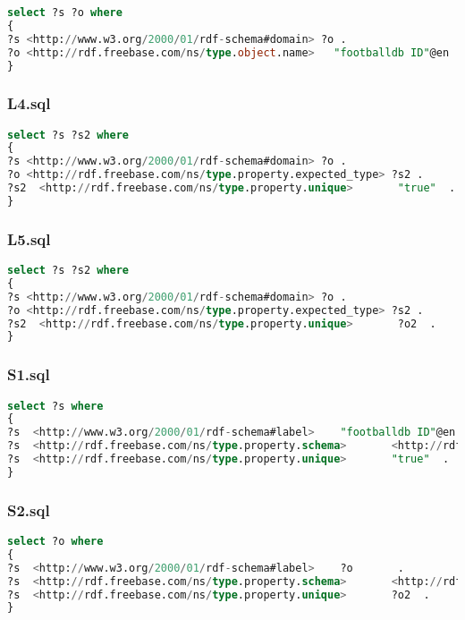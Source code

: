 \documentclass[titlepage, a4paper, 12pt] {article}
\begin{document}
\begin{lstlisting}[language=SQL]
select ?s ?o where
{
?s <http://www.w3.org/2000/01/rdf-schema#domain> ?o .
?o <http://rdf.freebase.com/ns/type.object.name>   "footballdb ID"@en       .
}
\end{lstlisting}

\subsubsection{L4.sql}

\begin{lstlisting}[language=SQL]
select ?s ?s2 where
{
?s <http://www.w3.org/2000/01/rdf-schema#domain> ?o .
?o <http://rdf.freebase.com/ns/type.property.expected_type> ?s2 .
?s2  <http://rdf.freebase.com/ns/type.property.unique>       "true"  .
}
\end{lstlisting}

\subsubsection{L5.sql}

\begin{lstlisting}[language=SQL]
select ?s ?s2 where
{
?s <http://www.w3.org/2000/01/rdf-schema#domain> ?o .
?o <http://rdf.freebase.com/ns/type.property.expected_type> ?s2 .
?s2  <http://rdf.freebase.com/ns/type.property.unique>       ?o2  .
}
\end{lstlisting}

\subsubsection{S1.sql}

\begin{lstlisting}[language=SQL]
select ?s where
{
?s  <http://www.w3.org/2000/01/rdf-schema#label>    "footballdb ID"@en       .
?s  <http://rdf.freebase.com/ns/type.property.schema>       <http://rdf.freebase.com/ns/american_football.football_player>   .
?s  <http://rdf.freebase.com/ns/type.property.unique>       "true"  .
}
\end{lstlisting}

\subsubsection{S2.sql}

\begin{lstlisting}[language=SQL]
select ?o where
{
?s  <http://www.w3.org/2000/01/rdf-schema#label>    ?o       .
?s  <http://rdf.freebase.com/ns/type.property.schema>       <http://rdf.freebase.com/ns/american_football.football_player>   .
?s  <http://rdf.freebase.com/ns/type.property.unique>       ?o2  .
}
\end{lstlisting}
\end{document}
